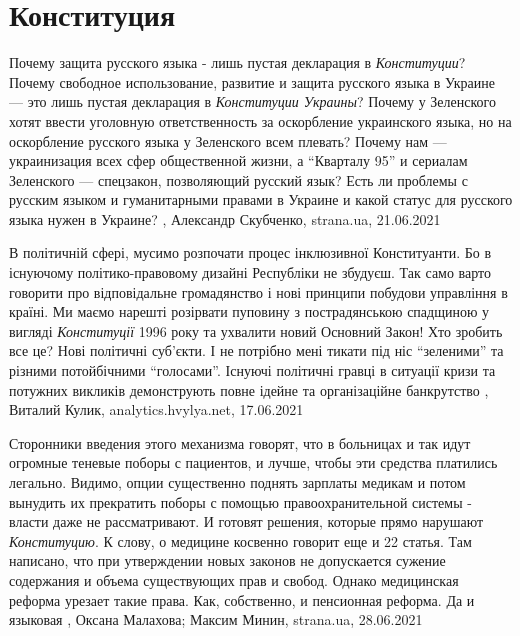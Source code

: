  
 
 
 
 
\chapter{Конституция}
\label{sec:slova.konstitucia}

Почему защита русского языка - лишь пустая декларация в \emph{Конституции}?
Почему свободное использование, развитие и защита русского языка в Украине —
это лишь пустая декларация в \emph{Конституции Украины}?  Почему у Зеленского
хотят ввести уголовную ответственность за оскорбление украинского языка, но на
оскорбление русского языка у Зеленского всем плевать?  Почему нам —
украинизация всех сфер общественной жизни, а \enquote{Кварталу 95} и сериалам
Зеленского — спецзакон, позволяющий русский язык?  Есть ли проблемы с русским
языком и гуманитарными правами в Украине и какой статус для русского языка
нужен в Украине?
, 
Александр Скубченко, strana.ua, 21.06.2021

В політичній сфері, мусимо розпочати процес інклюзивної Конституанти. Бо в
існуючому політико-правовому дизайні Республіки не збудуєш. Так само варто
говорити про відповідальне громадянство і нові принципи побудови управління в
країні. Ми маємо нарешті розірвати пуповину з пострадянською спадщиною у
вигляді \emph{Конституції} 1996 року та ухвалити новий Основний Закон!  Хто зробить
все це? Нові політичні суб'єкти.  І не потрібно мені тикати під ніс \enquote{зеленими}
та різними потойбічними \enquote{голосами}.
Існуючі політичні гравці в ситуації кризи та потужних викликів демонструють
повне ідейне та організаційне банкрутство
, 
Виталий Кулик, analytics.hvylya.net, 17.06.2021


Сторонники введения этого механизма говорят, что в больницах и так идут
огромные теневые поборы с пациентов, и лучше, чтобы эти средства платились
легально. Видимо, опции существенно поднять зарплаты медикам и потом вынудить
их прекратить поборы с помощью правоохранительной системы - власти даже не
рассматривают. И готовят решения, которые прямо нарушают \emph{Конституцию}.  К слову,
о медицине косвенно говорит еще и 22 статья. Там написано, что при утверждении
новых законов не допускается сужение содержания и объема существующих прав и
свобод. Однако медицинская реформа урезает такие права. Как, собственно, и
пенсионная реформа. Да и языковая
, 
Оксана Малахова; Максим Минин, strana.ua, 28.06.2021

